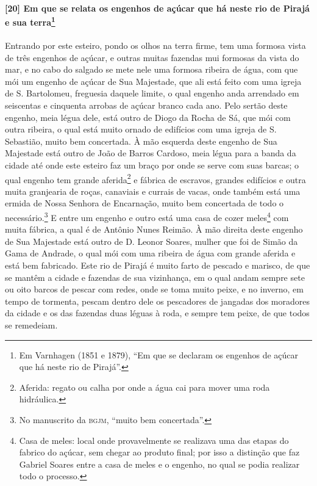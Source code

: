 \paragraph{[20] Em que se relata os engenhos de açúcar que há neste rio de Pirajá e sua
terra\protect\footnote{ Em Varnhagen (1851 e 1879), ``Em que se declaram os engenhos de
açúcar que há neste rio de Pirajá''.}}\quad
Entrando por este esteiro, pondo os olhos na terra firme, tem uma formosa vista de três
engenhos de açúcar, e outras muitas fazendas mui formosas da vista do mar, e no cabo do
salgado se mete nele uma formosa ribeira de água, com que mói um engenho de açúcar de Sua
Majestade, que ali está feito com uma igreja de S. Bartolomeu, freguesia daquele limite, o
qual engenho anda arrendado em seiscentas e cinquenta arrobas de açúcar branco cada ano.
Pelo sertão deste engenho, meia légua dele, está outro de Diogo da Rocha de Sá, que mói
com outra ribeira, o qual está muito ornado de edifícios com uma igreja de S. Sebastião,
muito bem concertada. À mão esquerda deste engenho de Sua Majestade está outro de João de
Barros Cardoso, meia légua para a banda da cidade até onde este esteiro faz um braço por
onde se serve com suas barcas; o qual engenho tem grande aferida\footnote{ Aferida: regato
ou calha por onde a água cai para mover uma roda hidráulica.} e fábrica de escravos,
grandes edifícios e outra muita granjearia de roças, canaviais e currais de vacas, onde
também está uma ermida de Nossa Senhora de Encarnação, muito bem concertada de todo o
necessário.\footnote{ No manuscrito da \textsc{bgjm}, ``muito bem concertada''.} E entre
um engenho e outro está uma casa de cozer meles\footnote{ Casa de meles: local onde
provavelmente se realizava uma das etapas do fabrico do açúcar, sem chegar ao produto
final; por isso a distinção que faz Gabriel Soares entre a casa de meles e o engenho, no
qual se podia realizar todo o processo.} com muita fábrica, a qual é de Antônio Nunes
Reimão. À mão direita deste engenho de Sua Majestade está outro de D. Leonor Soares,
mulher que foi de Simão da Gama de Andrade, o qual mói com uma ribeira de água com grande
aferida e está bem fabricado. Este rio de Pirajá é muito farto de pescado e marisco, de
que se mantêm a cidade e fazendas de sua vizinhança, em o qual andam sempre sete ou oito
barcos de pescar com redes, onde se toma muito peixe, e no inverno, em tempo de tormenta,
pescam dentro dele os pescadores de jangadas dos moradores da cidade e os das fazendas
duas léguas à roda, e sempre tem peixe, de que todos se remedeiam.

